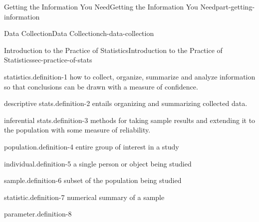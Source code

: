 \documentclass[oneside,10pt,]{book}
\numberwithin{equation}{section}
\begin{document}
\setcounter{tocdepth}{0}
\renewcommand*\contentsname{Contents}
\tableofcontents
\mainmatter
%
%
\typeout{************************************************}
\typeout{************************************************}
%
\begin{partptx}{Getting the Information You Need}{}{Getting the Information You Need}{}{}{part-getting-information}
%
\typeout{************************************************}
\typeout{************************************************}
%
\begin{chapterptx}{Data Collection}{}{Data Collection}{}{}{ch-data-collection}
%
%
\typeout{************************************************}
\typeout{************************************************}
%
\begin{sectionptx}{Introduction to the Practice of Statistics}{}{Introduction to the Practice of Statistics}{}{}{sec-practice-of-stats}
\begin{definition}{statistics.}{definition-1}%
how to collect, organize, summarize and analyze information so that conclusions can be drawn with a measure of confidence.\end{definition}
\begin{definition}{descriptive stats.}{definition-2}%
entails organizing and summarizing collected data.\end{definition}
\begin{definition}{inferential stats.}{definition-3}%
methods for taking sample results and extending it to the population with some measure of reliability.\end{definition}
\begin{definition}{population.}{definition-4}%
entire group of interest in a study\end{definition}
\begin{definition}{individual.}{definition-5}%
a single person or object being studied\end{definition}
\begin{definition}{sample.}{definition-6}%
subset of the population being studied\end{definition}
\begin{definition}{statistic.}{definition-7}%
numerical summary of a sample\end{definition}
\begin{definition}{parameter.}{definition-8}%

\end{definition}
\end{sectionptx}
\end{chapterptx}
\end{partptx}
\end{document}
